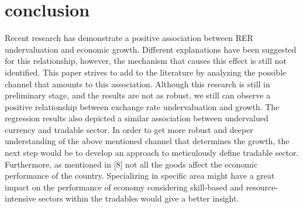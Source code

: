 \documentclass{article}
\begin{document}
\newpage
\section{conclusion}

Recent research has demonstrate a positive association between RER undervaluation and economic growth. Different explanations have been suggested for this relationship, however, the mechanism that causes this effect is still not identified. This paper strives to add to the literature by analyzing the possible channel that amounts to this association. Although this research is still in preliminary stage, and the results are not as robust, we still can observe a positive relationship between exchange rate undervaluation and growth. The regression results also depicted a similar association between undervalued currency and tradable sector. In order to get more robust and deeper understanding of the above mentioned channel that determines the growth, the next step would be to develop an approach to meticulously define tradable sector. Furthermore, as mentioned in [8] not all the goods affect the economic performance of the country. Specializing in specific area might have a great impact on the performance of economy considering skill-based and resource-intensive sectors within the tradables would give a better insight. 



\newpage


\end{document}
